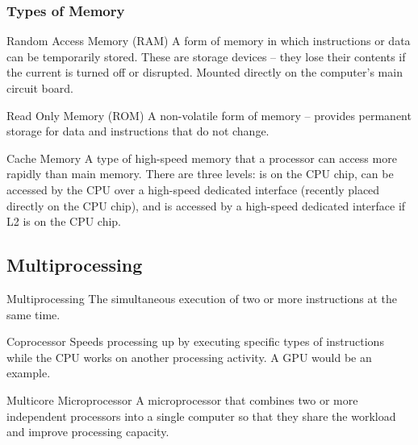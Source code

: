 \documentclass[\main/notes.tex]{subfiles}
\begin{document}
				\subsubsection{Types of Memory}
					\begin{definition}{Random Access Memory (RAM)}
						A form of memory in which instructions or data can be temporarily stored. These are  storage devices -- they lose their contents if the current is turned off or disrupted. Mounted directly on the computer's main circuit board.
					\end{definition}
					\begin{definition}{Read Only Memory (ROM)}
						A non-volatile form of memory -- provides permanent storage for data and instructions that do not change.
					\end{definition}
					\begin{definition}{Cache Memory}
						A type of high-speed memory that a processor can access more rapidly than main memory. There are three levels:  is on the CPU chip,  can be accessed by the CPU over a high-speed dedicated interface (recently placed directly on the CPU chip), and  is accessed by a high-speed dedicated interface if L2 is on the CPU chip.
					\end{definition}
			\subsection{Multiprocessing}
				\begin{definition}{Multiprocessing}
					The simultaneous execution of two or more instructions at the same time.
				\end{definition}
				\begin{definition}{Coprocessor}
					Speeds processing up by executing specific types of instructions while the CPU works on another processing activity. A GPU would be an example.
				\end{definition}
				\begin{definition}{Multicore Microprocessor}
					A microprocessor that combines two or more independent processors into a single computer so that they share the workload and improve processing capacity.
				\end{definition}
\end{document}
